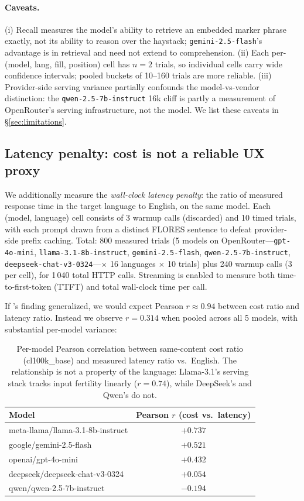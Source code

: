 \documentclass[11pt,a4paper]{article}
\begin{document}
\paragraph{Caveats.} (i) Recall measures the model's ability to retrieve an embedded marker phrase exactly, not its ability to reason over the haystack; \texttt{gemini-2.5-flash}'s advantage is in retrieval and need not extend to comprehension. (ii) Each per-(model, lang, fill, position) cell has $n=2$ trials, so individual cells carry wide confidence intervals; pooled buckets of 10--160 trials are more reliable. (iii) Provider-side serving variance partially confounds the model-vs-vendor distinction: the \texttt{qwen-2.5-7b-instruct} 16k cliff is partly a measurement of OpenRouter's serving infrastructure, not the model. We list these caveats in \S\ref{sec:limitations}.

\subsection{Latency penalty: cost is not a reliable UX proxy}
\label{sec:latency-results}

We additionally measure the \emph{wall-clock latency penalty}: the ratio of measured response time in the target language to English, on the same model. Each (model, language) cell consists of 3 warmup calls (discarded) and 10 timed trials, with each prompt drawn from a distinct FLORES sentence to defeat provider-side prefix caching. Total: 800 measured trials (5 models on OpenRouter---\texttt{gpt-4o-mini}, \texttt{llama-3.1-8b-instruct}, \texttt{gemini-2.5-flash}, \texttt{qwen-2.5-7b-instruct}, \texttt{deepseek-chat-v3-0324}---$\times$ 16 languages $\times$ 10 trials) plus 240 warmup calls (3 per cell), for 1\,040 total HTTP calls. Streaming is enabled to measure both time-to-first-token (TTFT) and total wall-clock time per call.

If \citet{somide2026african}'s finding generalized, we would expect Pearson $r \approx 0.94$ between cost ratio and latency ratio. Instead we observe $r = 0.314$ when pooled across all 5 models, with substantial per-model variance:

\begin{table}[h]
\centering
\small
\begin{tabular}{lc}
\toprule
Model & Pearson $r$ (cost vs.\ latency) \\
\midrule
meta-llama/llama-3.1-8b-instruct & $+0.737$ \\
google/gemini-2.5-flash          & $+0.521$ \\
openai/gpt-4o-mini               & $+0.432$ \\
deepseek/deepseek-chat-v3-0324   & $+0.054$ \\
qwen/qwen-2.5-7b-instruct        & $-0.194$ \\
\bottomrule
\end{tabular}
\caption{Per-model Pearson correlation between same-content cost ratio (cl100k\_base) and measured latency ratio vs.\ English. The relationship is not a property of the language: Llama-3.1's serving stack tracks input fertility linearly ($r = 0.74$), while DeepSeek's and Qwen's do not.}
\label{tab:latency-corr}
\end{table}
\end{document}
